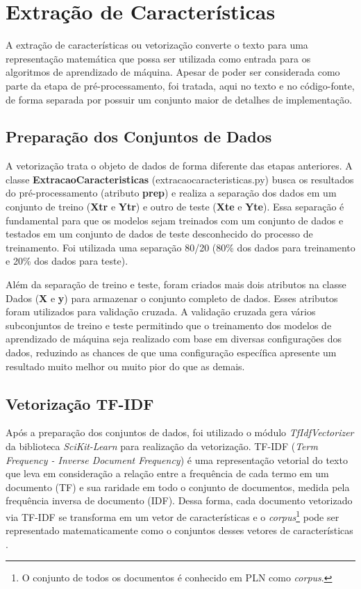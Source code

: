 \section{Extração de Características}

A extração de características ou vetorização converte o texto para uma representação matemática que possa ser utilizada como entrada para os algoritmos de aprendizado de máquina. Apesar de poder ser considerada como parte da etapa de pré-processamento, foi tratada, aqui no texto e no código-fonte, de forma separada por possuir um conjunto maior de detalhes de implementação.

\subsection{Preparação dos Conjuntos de Dados}

A vetorização trata o objeto de dados de forma diferente das etapas anteriores. A classe \textbf{ExtracaoCaracteristicas} (extracao\textunderscore caracteristicas.py) busca os resultados do pré-processamento (atributo \textbf{prep}) e realiza a separação dos dados em um conjunto de treino (\textbf{Xtr} e \textbf{Ytr}) e outro de teste (\textbf{Xte} e \textbf{Yte}). Essa separação é fundamental para que os modelos sejam treinados com um conjunto de dados e testados em um conjunto de dados de teste desconhecido do processo de treinamento. Foi utilizada uma separação 80/20 (80\% dos dados para treinamento e 20\% dos dados para teste). 

Além da separação de treino e teste, foram criados mais dois atributos na classe Dados (\textbf{X} e \textbf{y}) para armazenar o conjunto completo de dados. Esses atributos foram utilizados para validação cruzada. A validação cruzada gera vários subconjuntos de treino e teste permitindo que o treinamento dos modelos de aprendizado de máquina seja realizado com base em diversas configurações dos dados, reduzindo as chances de que uma configuração específica apresente um resultado muito melhor ou muito pior do que as demais.  

\subsection{Vetorização TF-IDF}

Após a preparação dos conjuntos de dados, foi utilizado o módulo \textit{TfIdfVectorizer} da biblioteca \textit{SciKit-Learn} para realização da vetorização. TF-IDF (\textit{Term Frequency - Inverse Document Frequency}) é uma representação vetorial do texto que leva em consideração a relação entre a frequência de cada termo em um documento (TF) e sua raridade em todo o conjunto de documentos, medida pela frequência inversa de documento (IDF). Dessa forma, cada documento vetorizado via TF-IDF se transforma em um vetor de características e o   \textit{corpus}\footnote{O conjunto de todos os documentos é conhecido em PLN como \textit{corpus}.} pode ser representado matematicamente como o conjuntos desses vetores de características \cite{DSNegocios2016}.

 